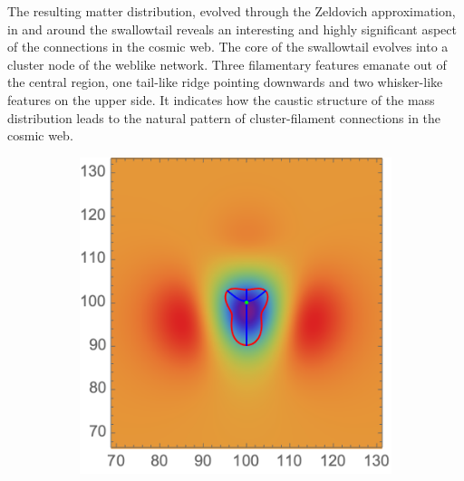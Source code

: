 \documentclass[a4paper, 11pt]{article}
\begin{document}
The resulting matter distribution, evolved through the Zeldovich approximation, in and around the swallowtail reveals an interesting and highly significant aspect of the connections in the cosmic web. The core of the swallowtail evolves into a cluster node of the weblike network. Three filamentary features emanate out of the central region, one tail-like ridge pointing downwards and two whisker-like features on the upper side. It indicates how the caustic structure of the mass distribution leads to the natural pattern of cluster-filament connections in the cosmic web. 

\begin{figure}
\centering
\begin{subfigure}[b]{0.32\textwidth}
\includegraphics[width=\textwidth]{Swallowtail_mean_Phi}
\end{subfigure}~
\begin{subfigure}[b]{0.32\textwidth}

\end{subfigure}
\end{figure}
\end{document}
